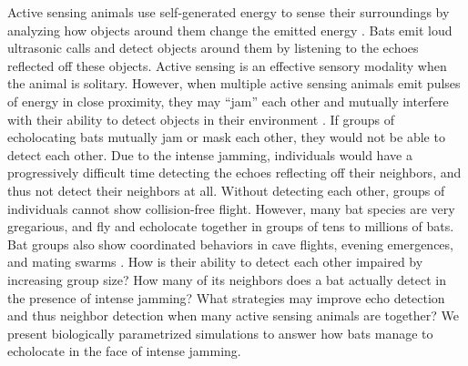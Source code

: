 \documentclass[
]{book}
\begin{document}
Active sensing animals use self-generated energy to sense their surroundings by analyzing how objects around them change the emitted energy \citep{nelson2006a}. Bats emit loud ultrasonic calls and detect objects around them by listening to the echoes \citep{fenton2013a, griffin1958a}reflected off these objects. Active sensing is an effective sensory modality when the animal is solitary. However, when multiple active sensing animals emit pulses of energy in close proximity, they may ``jam'' each other and mutually interfere with their ability to detect objects in their environment \citep[\citet{matsubara1978a}]{nelson2006a}. If groups of echolocating bats mutually jam or mask each other, they would not be able to detect each other. Due to the intense jamming, individuals would have a progressively difficult time detecting the echoes reflecting off their neighbors, and thus not detect their neighbors at all. Without detecting each other, groups of individuals cannot show collision-free flight. However, many bat species are very gregarious, and fly and echolocate together in groups of tens to millions of bats. Bat groups also show coordinated behaviors in cave flights, evening emergences, and mating swarms \citep[\citet{kunz1982a}]{ortega2016a}. How is their ability to detect each other impaired by increasing group size? How many of its neighbors does a bat actually detect in the presence of intense jamming? What strategies may improve echo detection and thus neighbor detection when many active sensing animals are together? We present biologically parametrized simulations to answer how bats manage to echolocate in the face of intense jamming.
\end{document}
